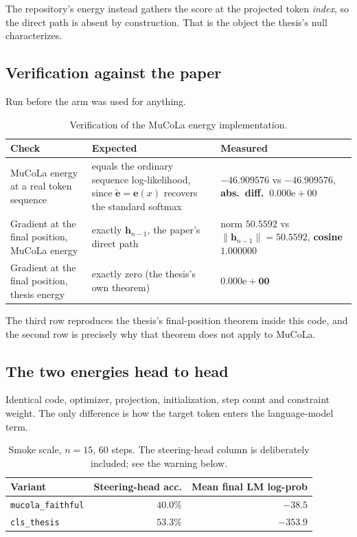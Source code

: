 \documentclass[11pt,a4paper]{article}
\newcommand{\ve}{\bm{e}}
\newcommand{\vh}{\bm{h}}
\begin{document}
The repository's energy instead gathers the score at the projected token \emph{index},
so the direct path is absent by construction. That is the object the thesis's null
characterizes.

\subsection{Verification against the paper}

Run before the arm was used for anything.

\begin{table}[htbp]
\centering
\begin{tabular}{p{5.6cm}p{4.4cm}p{4.4cm}}
\toprule
Check & Expected & Measured \\
\midrule
MuCoLa energy at a real token sequence & equals the ordinary sequence log-likelihood, since $\tilde{\ve}=\ve(x)$ recovers the standard softmax & $-46.909576$ vs $-46.909576$, \textbf{abs.\ diff.\ $0.000\mathrm{e}{+}00$} \\
Gradient at the final position, MuCoLa energy & exactly $\vh_{n-1}$, the paper's direct path & norm $50.5592$ vs $\lVert \vh_{n-1}\rVert = 50.5592$, \textbf{cosine $1.000000$} \\
Gradient at the final position, thesis energy & exactly zero (the thesis's own theorem) & $\bm{0.000\mathrm{e}{+}00}$ \\
\bottomrule
\end{tabular}
\caption{Verification of the MuCoLa energy implementation.}
\end{table}

The third row reproduces the thesis's final-position theorem inside this code, and the
second row is precisely why that theorem does not apply to MuCoLa.

\subsection{The two energies head to head}

Identical code, optimizer, projection, initialization, step count and constraint weight.
The only difference is how the target token enters the language-model term.

\begin{table}[htbp]
\centering
\begin{tabular}{lrr}
\toprule
Variant & Steering-head acc. & Mean final LM log-prob \\
\midrule
\texttt{mucola\_faithful} & $40.0\%$ & $\bm{-38.5}$ \\
\texttt{cls\_thesis} & $53.3\%$ & $\bm{-353.9}$ \\
\bottomrule
\end{tabular}
\caption{Smoke scale, $n=15$, 60 steps. The steering-head column is deliberately
included; see the warning below.}
\end{table}
\end{document}
